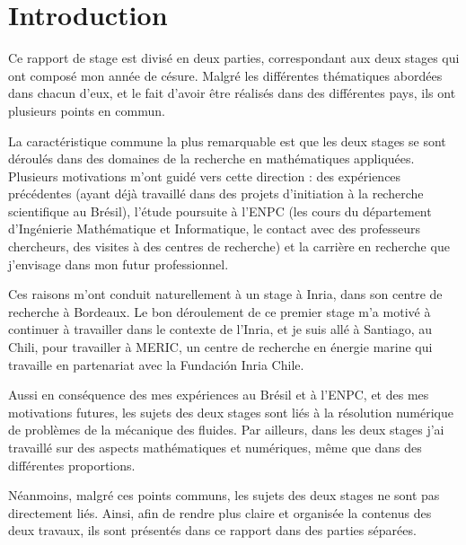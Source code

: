\part*{Introduction}

\indent Ce rapport de stage est divisé en deux parties, correspondant aux deux stages qui ont composé mon année de césure. Malgré les différentes thématiques abordées dans chacun d'eux, et le fait d'avoir être réalisés dans des différentes pays, ils ont plusieurs points en commun.

\indent La caractéristique commune la plus remarquable est que les deux stages se sont déroulés dans des domaines de la recherche en mathématiques appliquées. Plusieurs motivations m'ont guidé vers cette direction : des expériences précédentes (ayant déjà travaillé dans des projets d'initiation à la recherche scientifique au Brésil), l'étude poursuite à l'ENPC (les cours du département d’Ingénierie Mathématique et Informatique, le contact avec des professeurs chercheurs, des visites à des centres de recherche) et la carrière en recherche que j'envisage dans mon futur professionnel.

\indent Ces raisons m'ont conduit naturellement à un stage à Inria, dans son centre de recherche à Bordeaux. Le bon déroulement de ce premier stage m'a motivé à continuer à travailler dans le contexte de l'Inria, et je suis allé à Santiago, au Chili, pour travailler à MERIC, un centre de recherche en énergie marine qui travaille en partenariat avec la Fundación Inria Chile.

\indent Aussi en conséquence des mes expériences au Brésil et à l'ENPC, et des mes motivations futures, les sujets des deux stages sont liés à la résolution numérique de problèmes de la mécanique des fluides. Par ailleurs, dans les deux stages j'ai travaillé sur des aspects mathématiques et numériques, même que dans des différentes proportions. 

\indent Néanmoins, malgré ces points communs, les sujets des deux stages ne sont pas directement liés. Ainsi, afin de rendre plus claire et organisée la contenus des deux travaux, ils sont présentés dans ce rapport dans des parties séparées.